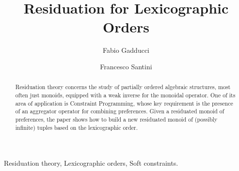 \documentclass[a4paper]{elsarticle}
\newcommand{\1}{\mathbf{1}}
\begin{document}
\begin{frontmatter}





\title{Residuation for Lexicographic Orders}


		\author[pisa]{Fabio Gadducci}
		\author[perugia]{Francesco Santini}
		
		\address[pisa]{Dipartimento di Informatica, Universit{\`a} degli Studi di Pisa, Italy}	
		\address[perugia]{Dipartimento di Matematica e Informatica, Universit{\`a} degli Studi di Perugia, Italy}	



\begin{abstract} 
	Residuation theory concerns the study of partially ordered algebraic structures, most often just monoids,
	equipped with a weak inverse for the monoidal operator.
	One of its area of application is Constraint Programming, whose 
	key requirement is the presence of an aggregator operator for combining preferences.
	Given a residuated monoid of preferences, the paper shows how to build a new residuated monoid 
	of (possibly infinite) tuples based on the lexicographic order. 
\end{abstract}
        \begin{keyword}
        	Residuation theory, Lexicographic orders, Soft constraints. %
        \end{keyword}
    \end{frontmatter}
\end{document}
